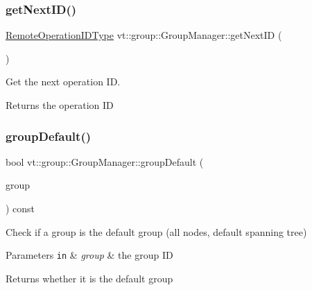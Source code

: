 \subsubsection{\texorpdfstring{get\+Next\+I\+D()}{getNextID()}}
{\footnotesize\ttfamily \hyperlink{namespacevt_1_1group_a73f2624ddeb535b39a08b6524f26b244}{Remote\+Operation\+I\+D\+Type} vt\+::group\+::\+Group\+Manager\+::get\+Next\+ID (\begin{DoxyParamCaption}{ }\end{DoxyParamCaption})}



Get the next operation ID. 

\begin{DoxyReturn}{Returns}
the operation ID 
\end{DoxyReturn}
\mbox{\label{structvt_1_1group_1_1_group_manager_ad9ae779b8223ad458edd62ae5e8a9003}} 
\subsubsection{\texorpdfstring{group\+Default()}{groupDefault()}}
{\footnotesize\ttfamily bool vt\+::group\+::\+Group\+Manager\+::group\+Default (\begin{DoxyParamCaption}\item[{\hyperlink{namespacevt_a27b5e4411c9b6140c49100e050e2f743}{Group\+Type} const \&}]{group }\end{DoxyParamCaption}) const}



Check if a group is the default group (all nodes, default spanning tree) 


\begin{DoxyParams}[1]{Parameters}
\mbox{\tt in}  & {\em group} & the group ID\\
\hline
\end{DoxyParams}
\begin{DoxyReturn}{Returns}
whether it is the default group 
\end{DoxyReturn}
\mbox{\label{structvt_1_1group_1_1_group_manager_a0670dfd6a524c967c687dcbee6e09ace}} 
